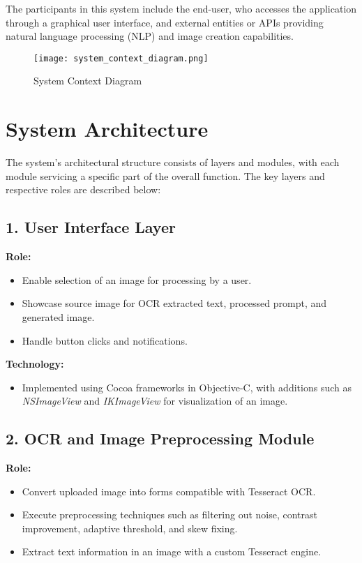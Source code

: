 The participants in this system include the end-user, who accesses the application through a graphical user interface, and external entities or APIs providing natural language processing (NLP) and image creation capabilities.

\begin{figure}[h]
    \centering
    \texttt{[image: system\_context\_diagram.png]} %
    \caption{System Context Diagram}
    \label{fig:system_context}
\end{figure}

\section{System Architecture}

The system's architectural structure consists of layers and modules, with each module servicing a specific part of the overall function. The key layers and respective roles are described below:

\subsection*{1. User Interface Layer}
\textbf{Role:}
\begin{itemize}
    \item Enable selection of an image for processing by a user.
    \item Showcase source image for OCR extracted text, processed prompt, and generated image.
    \item Handle button clicks and notifications.
\end{itemize}
\textbf{Technology:}
\begin{itemize}
    \item Implemented using Cocoa frameworks in Objective-C, with additions such as \textit{NSImageView} and \textit{IKImageView} for visualization of an image.
\end{itemize}

\subsection*{2. OCR and Image Preprocessing Module}
\textbf{Role:}
\begin{itemize}
    \item Convert uploaded image into forms compatible with Tesseract OCR.
    \item Execute preprocessing techniques such as filtering out noise, contrast improvement, adaptive threshold, and skew fixing.
    \item Extract text information in an image with a custom Tesseract engine.
\end{itemize}

